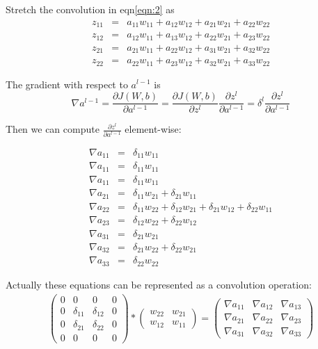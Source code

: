 \documentclass{article} %
\begin{document}
Stretch the convolution in eqn\ref{eqn:2} as
\begin{eqnarray}
z_{11} &=& a_{11}w_{11} + a_{12}w_{12} + a_{21}w_{21} +   a_{22}w_{22}\\
z_{12} &=& a_{12}w_{11} + a_{13}w_{12} + a_{22}w_{21} +   a_{23}w_{22}\\
z_{21} &=& a_{21}w_{11} + a_{22}w_{12} + a_{31}w_{21} +   a_{32}w_{22}\\
z_{22} &=& a_{22}w_{11} + a_{23}w_{12} + a_{32}w_{21} +   a_{33}w_{22}
\end{eqnarray}

The gradient with respect to $a^{l-1}$ is
$$\nabla a^{l-1} = \frac{\partial J(W,b)}{\partial a^{l-1}} = \frac{\partial J(W,b)}{\partial z^{l}} \frac{\partial z^{l}}{\partial a^{l-1}} = \delta^{l} \frac{\partial z^{l}}{\partial a^{l-1}}$$

Then we can compute $\frac{\partial z^{l}}{\partial a^{l-1}}$ element-wise:

\begin{eqnarray*}
\nabla a_{11} &=& \delta_{11}w_{11}\\
\nabla a_{11} &=& \delta_{11}w_{11}\\
\nabla a_{11} &=& \delta_{11}w_{11}\\
\nabla a_{21} &=& \delta_{11}w_{21} + \delta_{21}w_{11}\\
\nabla a_{22} &=& \delta_{11}w_{22} + \delta_{12}w_{21} + \delta_{21}w_{12} + \delta_{22}w_{11}\\
\nabla a_{23} &=& \delta_{12}w_{22} + \delta_{22}w_{12}\\
\nabla a_{31} &=& \delta_{21}w_{21}\\
\nabla a_{32} &=& \delta_{21}w_{22} + \delta_{22}w_{21}\\
\nabla a_{33} &=& \delta_{22}w_{22}
\end{eqnarray*}

Actually these equations can be represented as a convolution operation:
\begin{eqnarray*}
	\left( \begin{array}{cccc} 
		0&0&0&0 \\ 
		0&\delta_{11}& \delta_{12}&0 \\ 
		0&\delta_{21}&\delta_{22}&0 \\ 
		0&0&0&0 \end{array} \right) 
	* 
	\left( \begin{array}{ccc} 
		w_{22}&w_{21}\\ 
		w_{12}&w_{11} 
	\end{array} \right)  
	= 
	\left( \begin{array}{ccc} 
		\nabla a_{11}&\nabla a_{12}&\nabla a_{13} \\ 
		\nabla a_{21}&\nabla a_{22}&\nabla a_{23}\\ 
		\nabla a_{31}&\nabla a_{32}&\nabla a_{33} 
	\end{array} \right)
\end{eqnarray*}
\end{document}
